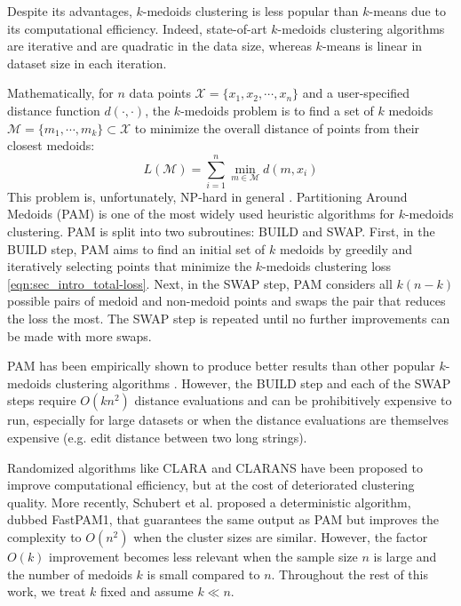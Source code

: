 
Despite its advantages, $k$-medoids clustering is less popular than $k$-means due to its computational efficiency. 
Indeed, state-of-art $k$-medoids clustering algorithms are iterative and are quadratic in the data size, whereas $k$-means is linear in dataset size in each iteration. 

Mathematically, for $n$ data points $\mathcal{X} =  \{ x_1, x_2, \cdots, x_n \}$ and a user-specified distance function $d(\cdot, \cdot)$, the $k$-medoids problem is to find a set of $k$ medoids $\mathcal{M} = \{m_1, \cdots, m_k \} \subset \mathcal{X}$ to minimize the overall distance of points from their closest medoids: 
\begin{equation} \label{eqn:sec_intro_total-loss}
    L(\mathcal{M}) =  \sum_{i=1}^n \min_{m \in \mathcal{M}} d(m, x_i)
\end{equation}
This problem is, unfortunately, NP-hard in general \cite{schubert2019faster}.
Partitioning Around Medoids (PAM) \cite{kaufman1987clustering, kaufman1990partitioning} is one of the most widely used heuristic algorithms for $k$-medoids clustering.
PAM is split into two subroutines: BUILD and SWAP.
First, in the BUILD step, PAM aims to find an initial set of $k$ medoids by greedily and iteratively selecting points that minimize the $k$-medoids clustering loss \eqref{eqn:sec_intro_total-loss}. 
Next, in the SWAP step, PAM considers all $k(n-k)$ possible pairs of medoid and non-medoid points and swaps the pair that reduces the loss the most. 
The SWAP step is repeated until no further improvements can be made with more swaps.

PAM has been empirically shown to produce better results than other popular $k$-medoids clustering algorithms \cite{reynolds2006clustering,schubert2019faster}.
However, the BUILD step and each of the SWAP steps require  $O(kn^2)$ distance evaluations and can be prohibitively expensive to run, especially for large datasets or when the distance evaluations are themselves expensive (e.g. edit distance between two long strings).

Randomized algorithms like CLARA \cite{kaufman1990partitioning} and CLARANS \cite{ng2002clarans} have been proposed to improve computational efficiency, but at the cost of deteriorated clustering quality.
More recently, Schubert et al. \cite{schubert2019faster} proposed a deterministic algorithm, dubbed FastPAM1, that guarantees the same output as PAM but improves the complexity to $O(n^2)$ when the cluster sizes are similar. However, the factor $O(k)$ improvement becomes less relevant when the sample size $n$ is large and the number of medoids $k$ is small compared to $n$.  Throughout the rest of this work, we treat $k$ fixed and assume $k \ll n$.

